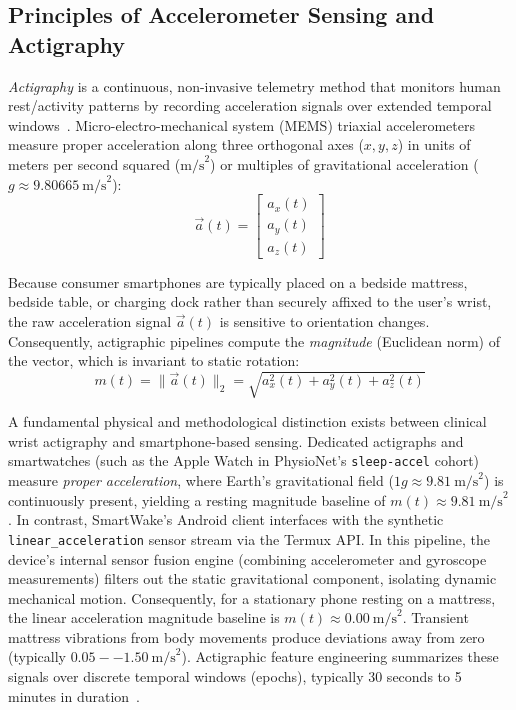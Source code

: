 \documentclass[journal,11pt,onecolumn]{IEEEtran}
\begin{document}
\subsection{Principles of Accelerometer Sensing and Actigraphy}
\textit{Actigraphy} is a continuous, non-invasive telemetry method that monitors human rest/activity patterns by recording acceleration signals over extended temporal windows~\cite{ancoli2003role}. Micro-electro-mechanical system (MEMS) triaxial accelerometers measure proper acceleration along three orthogonal axes ($x, y, z$) in units of meters per second squared ($\text{m/s}^2$) or multiples of gravitational acceleration ($g \approx 9.80665~\text{m/s}^2$):
\begin{equation}
\label{eq:acceleration_vector}
\vec{a}(t) = \begin{bmatrix} a_x(t) \\ a_y(t) \\ a_z(t) \end{bmatrix}
\end{equation}

Because consumer smartphones are typically placed on a bedside mattress, bedside table, or charging dock rather than securely affixed to the user's wrist, the raw acceleration signal $\vec{a}(t)$ is sensitive to orientation changes. Consequently, actigraphic pipelines compute the \textit{magnitude} (Euclidean norm) of the vector, which is invariant to static rotation:
\begin{equation}
\label{eq:magnitude}
m(t) = \|\vec{a}(t)\|_2 = \sqrt{a_x^2(t) + a_y^2(t) + a_z^2(t)}
\end{equation}

A fundamental physical and methodological distinction exists between clinical wrist actigraphy and smartphone-based sensing. Dedicated actigraphs and smartwatches (such as the Apple Watch in PhysioNet's \texttt{sleep-accel} cohort) measure \textit{proper acceleration}, where Earth's gravitational field ($1g \approx 9.81~\text{m/s}^2$) is continuously present, yielding a resting magnitude baseline of $m(t) \approx 9.81~\text{m/s}^2$. In contrast, SmartWake's Android client interfaces with the synthetic \texttt{linear\_acceleration} sensor stream via the Termux API. In this pipeline, the device's internal sensor fusion engine (combining accelerometer and gyroscope measurements) filters out the static gravitational component, isolating dynamic mechanical motion. Consequently, for a stationary phone resting on a mattress, the linear acceleration magnitude baseline is $m(t) \approx 0.00~\text{m/s}^2$. Transient mattress vibrations from body movements produce deviations away from zero (typically $0.05--1.50~\text{m/s}^2$). Actigraphic feature engineering summarizes these signals over discrete temporal windows (epochs), typically 30 seconds to 5 minutes in duration~\cite{sadeh1994activity, cole1992automatic}.
\end{document}
